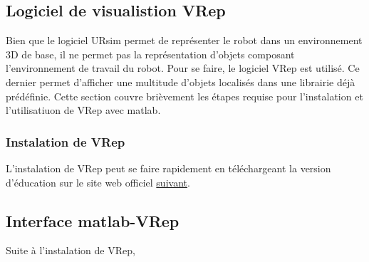 \subsection{Logiciel de visualistion VRep}

Bien que le logiciel URsim permet de représenter le robot dans un environnement 3D de base, il ne permet pas la représentation d'objets composant l'environnement de travail du robot.
Pour se faire, le logiciel VRep est utilisé.
Ce dernier permet d'afficher une multitude d'objets localisés dans une librairie déjà prédéfinie.
Cette section couvre brièvement les étapes requise pour l'instalation et l'utilisatiuon de VRep avec matlab.

\subsubsection{Instalation de VRep}

L'instalation de VRep peut se faire rapidement en téléchargeant la version d'éducation sur le site web officiel \href{http://www.coppeliarobotics.com/downloads.html}{suivant}.

\subsection{Interface matlab-VRep}

Suite à l'instalation de VRep, 

\newpage
























 